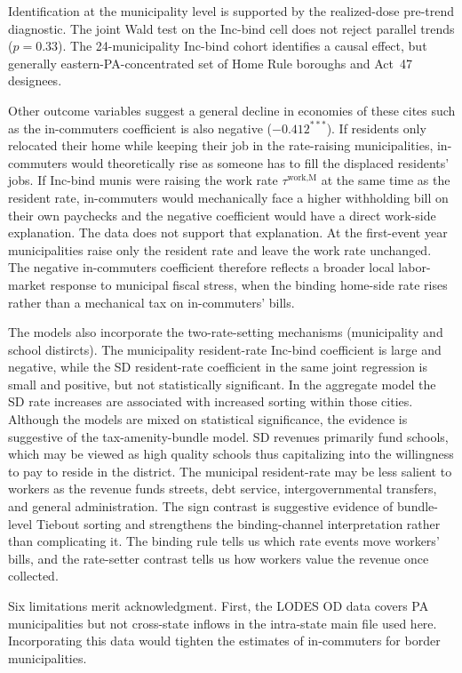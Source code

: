 \documentclass[12pt]{article}
\begin{document}
Identification at the municipality level is supported by the
realized-dose pre-trend diagnostic. The joint Wald test on the Inc-bind cell does not reject parallel
trends ($p = 0.33$). The 24-municipality Inc-bind cohort identifies a causal effect, but generally eastern-PA-concentrated
set of Home Rule boroughs and Act~47 designees.

Other outcome variables suggest a general decline in economies of these cites such as the in-commuters coefficient is also negative
($-0.412^{\ast\ast\ast}$). If
residents only relocated their home while keeping their
job in the rate-raising municipalities, in-commuters would
theoretically rise as someone has to fill the displaced residents' jobs. If Inc-bind munis
were raising the work rate $\tau^{\text{work,M}}$ at the same time
as the resident rate, in-commuters would mechanically face a higher
withholding bill on their own paychecks and the negative coefficient
would have a direct work-side explanation. The data does not support that explanation. At the first-event year municipalities raise
only the resident rate and leave the work rate unchanged. The negative
in-commuters coefficient therefore reflects a broader local
labor-market response to municipal fiscal stress, when the binding home-side rate rises rather than a
mechanical tax on in-commuters' bills.

The models also incorporate the two-rate-setting mechanisms (municipality and school distircts). The municipality resident-rate Inc-bind
coefficient is large and negative, while the SD resident-rate
coefficient in the same joint regression is small and
positive, but not statistically significant. In the aggregate model the SD rate increases are associated with increased sorting within those cities. Although the models are mixed on statistical significance, the evidence is suggestive of the tax-amenity-bundle model. SD
revenues primarily fund schools, which may be viewed as high quality schools thus capitalizing into the
willingness to pay to reside in the district. The municipal resident-rate may be less salient to workers as the revenue funds streets, debt service,
intergovernmental transfers, and general administration.
The sign contrast is suggestive evidence of bundle-level Tiebout
sorting and strengthens the binding-channel interpretation rather
than complicating it. The binding rule tells us which rate
events move workers' bills, and the rate-setter contrast tells us
how workers value the revenue once collected.

Six limitations merit acknowledgment. First, the LODES OD data
covers PA municipalities but not cross-state inflows in the
intra-state main file used here. Incorporating this data would
tighten the estimates of in-commuters for border municipalities.
\end{document}
